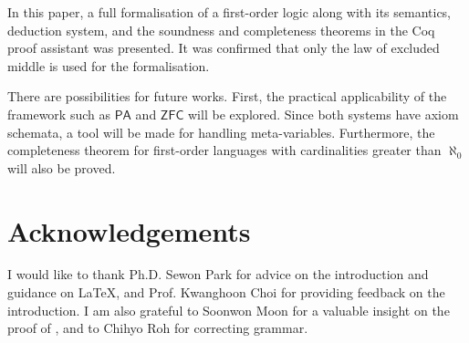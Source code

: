 \documentclass[twocolumn]{article}
\theoremstyle{definition}
\theoremstyle{definition}
\theoremstyle{definition}
\theoremstyle{definition}
\theoremstyle{definition}
\theoremstyle{definition}
\theoremstyle{definition}
\newcommand{\0}{\texttt{0}}
\newcommand{\1}{\texttt{1}}
\begin{document}
In this paper, a full formalisation of a first-order logic along with its semantics, deduction system, and the soundness and completeness theorems in the Coq proof assistant was presented.
It was confirmed that only the law of excluded middle is used for the formalisation.

There are possibilities for future works.
First, the practical applicability of the framework such as $\mathsf{PA}$ and $\mathsf{ZFC}$ will be explored.
Since both systems have axiom schemata, a tool will be made for handling meta-variables.
Furthermore, the completeness theorem for first-order languages with cardinalities greater than $\aleph_0$ will also be proved.

\section*{Acknowledgements}
\label{s:Acknowledgements}

I would like to thank Ph.D. Sewon Park for advice on the introduction and guidance on \LaTeX, and Prof. Kwanghoon Choi for providing feedback on the introduction.
I am also grateful to Soonwon Moon for a valuable insight on the proof of , and to Chihyo Roh for correcting grammar.



\end{document}
